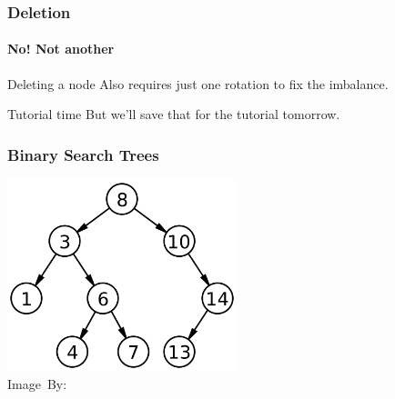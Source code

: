 \begin{frame}
	\frametitle{Deletion}
	\framesubtitle{No! Not another}
		\begin{block}{Deleting a node}
			Also requires just one rotation to fix the imbalance.
		\end{block}	
		
			\begin{block}{Tutorial time}
			  But we'll save that for the tutorial tomorrow.	
			\end{block}	
\end{frame}


\begin{frame}
	\frametitle{Binary Search Trees}
	\begin{center}
		\includegraphics[width=0.5\textwidth]{images/btree.png}\\
		\hspace*{15pt}\hbox{\scriptsize Image By:}
	\end{center}
\end{frame}

